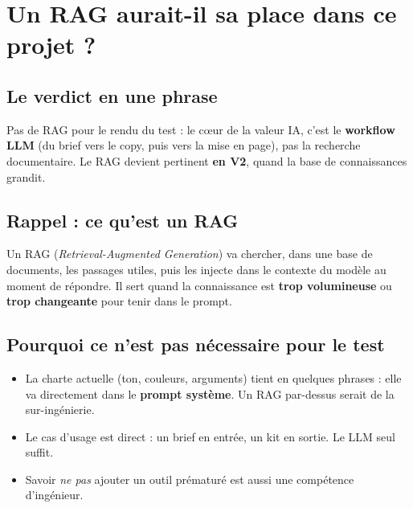 \documentclass[11pt,a4paper]{article}
\begin{document}
\section{Un RAG aurait-il sa place dans ce projet ?}

\subsection{Le verdict en une phrase}
Pas de RAG pour le rendu du test : le cœur de la valeur IA, c'est le
\textbf{workflow LLM} (du brief vers le copy, puis vers la mise en page), pas la
recherche documentaire. Le RAG devient pertinent \textbf{en V2}, quand la base de
connaissances grandit.

\subsection{Rappel : ce qu'est un RAG}
Un RAG (\emph{Retrieval-Augmented Generation}) va chercher, dans une base de
documents, les passages utiles, puis les injecte dans le contexte du modèle au
moment de répondre. Il sert quand la connaissance est \textbf{trop volumineuse} ou
\textbf{trop changeante} pour tenir dans le prompt.

\subsection{Pourquoi ce n'est pas nécessaire pour le test}
\begin{itemize}[leftmargin=1.4em]
  \item La charte actuelle (ton, couleurs, arguments) tient en quelques phrases :
        elle va directement dans le \textbf{prompt système}. Un RAG par-dessus
        serait de la sur-ingénierie.
  \item Le cas d'usage est direct : un brief en entrée, un kit en sortie. Le LLM
        seul suffit.
  \item Savoir \emph{ne pas} ajouter un outil prématuré est aussi une compétence
        d'ingénieur.
\end{itemize}
\end{document}
